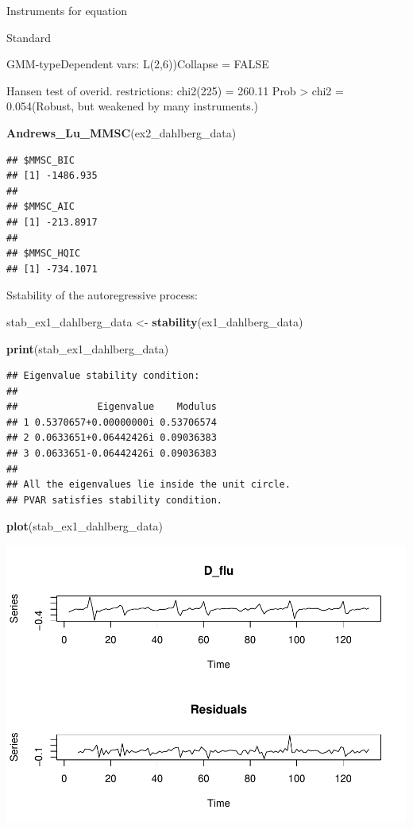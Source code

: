 \documentclass[
]{book}
\newenvironment{Shaded}{\begin{snugshade}}{\end{snugshade}}
\newcommand{\FunctionTok}[1]{\textcolor[rgb]{0.13,0.29,0.53}{\textbf{#1}}}
\newcommand{\NormalTok}[1]{#1}
\newcommand{\OtherTok}[1]{\textcolor[rgb]{0.56,0.35,0.01}{#1}}
\begin{document}
Instruments for equation

Standard

GMM-typeDependent vars: L(2,6))Collapse = FALSE

Hansen test of overid. restrictions: chi2(225) = 260.11 Prob \textgreater{} chi2 = 0.054(Robust, but weakened by many instruments.)

\begin{Shaded}
\begin{Highlighting}[]
\FunctionTok{Andrews\_Lu\_MMSC}\NormalTok{(ex2\_dahlberg\_data)}
\end{Highlighting}
\end{Shaded}

\begin{verbatim}
## $MMSC_BIC
## [1] -1486.935
## 
## $MMSC_AIC
## [1] -213.8917
## 
## $MMSC_HQIC
## [1] -734.1071
\end{verbatim}

Sstability of the autoregressive process:

\begin{Shaded}
\begin{Highlighting}[]
\NormalTok{stab\_ex1\_dahlberg\_data }\OtherTok{\textless{}{-}} \FunctionTok{stability}\NormalTok{(ex1\_dahlberg\_data)}

\FunctionTok{print}\NormalTok{(stab\_ex1\_dahlberg\_data)}
\end{Highlighting}
\end{Shaded}

\begin{verbatim}
## Eigenvalue stability condition:
## 
##              Eigenvalue    Modulus
## 1 0.5370657+0.00000000i 0.53706574
## 2 0.0633651+0.06442426i 0.09036383
## 3 0.0633651-0.06442426i 0.09036383
## 
## All the eigenvalues lie inside the unit circle.
## PVAR satisfies stability condition.
\end{verbatim}

\begin{Shaded}
\begin{Highlighting}[]
\FunctionTok{plot}\NormalTok{(stab\_ex1\_dahlberg\_data)}
\end{Highlighting}
\end{Shaded}

\includegraphics{Notas-Series-Tiempo_files/figure-latex/unnamed-chunk-61-1.pdf}
\end{document}
